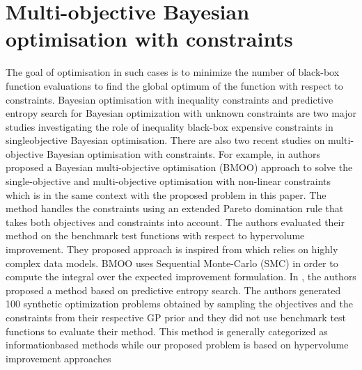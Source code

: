 \section{Multi-objective Bayesian optimisation with constraints}
The goal of optimisation in such cases is to minimize the number of black-box function evaluations to find the global optimum of the function with respect to constraints. Bayesian optimisation with inequality constraints \cite{gardner2014bayesian} and predictive entropy search for Bayesian optimization with unknown constraints \cite{garrido2016predictive} are two major studies investigating the role of inequality black-box expensive constraints in singleobjective Bayesian optimisation. There are also two recent studies on multi-objective Bayesian optimisation with constraints.
For example, in \cite{feliot2017bayesian} authors proposed a Bayesian multi-objective optimisation (BMOO) approach to solve the single-objective and multi-objective optimisation with non-linear constraints which is in the same context with the proposed problem in this paper. The method handles
the constraints using an extended Pareto domination rule that takes both objectives and constraints into account. The authors evaluated their method on the benchmark test functions with respect to hypervolume improvement. They proposed approach is inspired from \cite{oyama2007new} which relies on highly complex data models. BMOO uses Sequential Monte-Carlo (SMC) in order to compute the integral over the expected improvement formulation. In \cite{garrido2016predictive}, the authors proposed a method based on predictive entropy search. The authors generated 100 synthetic optimization
problems obtained by sampling the objectives and the constraints from their respective GP prior and they did not use benchmark test functions to evaluate their method. This method is generally categorized as informationbased methods while our proposed problem is based on hypervolume improvement approaches

